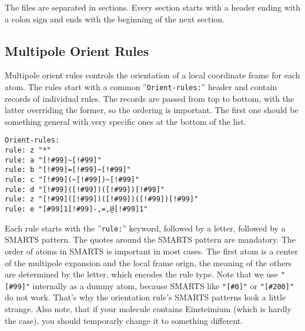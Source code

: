 \documentclass[10pt,a4paper]{article}
\begin{document}
The files are separated in sections. Every section starts with a header ending with 
a colon sign and ends with the beginning of the next section.

\subsection{Multipole Orient Rules}
Multipole orient rules controls the orientation of a local coordinate frame for each atom. 
The rules start with a common ''\lstinline{Orient-rules:}'' header and contain records of
individual rules. The records are passed from top to bottom, with the latter overriding the
former, so the ordering is important. The first one should be something general with 
very specific ones at the bottom of the list.
\begin{lstlisting}[style=file]
Orient-rules:
rule: z "*"                                             
rule: a "[!#99]~[!#99]"                                            
rule: b "[!#99]=[!#99]~[!#99]"                                   
rule: c "[!#99](~[!#99])~[!#99]"                                   
rule: d "[!#99]([!#99])([!#99])[!#99]"                          
rule: z "[!#99]([!#99])([!#99])([!#99])[!#99]"           
rule: e "[#99]1[!#99]-,=,@[!#99]1"                     
\end{lstlisting}
Each rule starts with the ''\lstinline{rule:}'' keyword, followed by a letter, followed 
by a SMARTS
pattern. The quotes around the SMARTS pattern are mandatory.  The order of atoms in SMARTS
is important in most cases. The first atom is a center of the multipole expansion and 
the local frame orign, the meaning of the others are determined by the letter, 
which encodes the rule type. Note that we use \lstinline{"[#99]"} internally as 
a dummy atom, because SMARTS like \lstinline{"[#0]"} or \lstinline{"[#200]"} do not work. 
That's why the orientation rule's SMARTS patterns look a little strange. 
Also note, that if your molecule contains Einsteimium (which is hardly the case),
you should temporarly change it to something different. 
\end{document}
